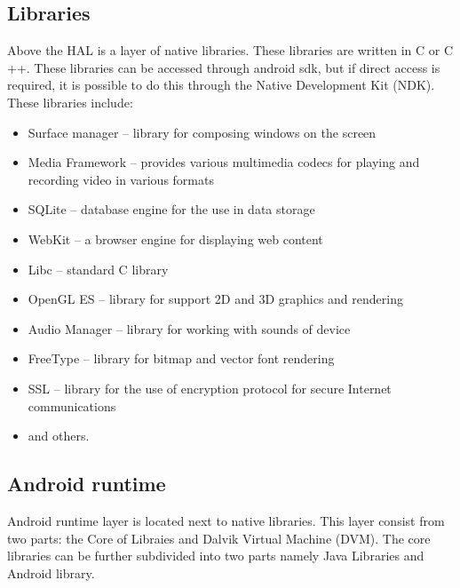 \subsection{Libraries}
Above the HAL is a layer of native libraries. These libraries are written in C or C ++. These libraries can be accessed through android sdk, but if direct access is required, it is possible to do this through the Native Development Kit (NDK). These libraries include:

\begin{itemize} %
\item Surface manager -- library for composing windows on the screen
\item Media Framework -- provides various multimedia codecs for playing and recording video in various formats
\item SQLite -- database engine for the use in data storage
\item WebKit -- a browser engine for displaying web content
\item Libc -- standard C library
\item OpenGL ES -- library for support 2D and 3D graphics and rendering
\item Audio Manager -- library for working with sounds of device
\item FreeType -- library for bitmap and vector font rendering
\item SSL -- library for the use of encryption protocol for secure Internet communications
\item and others.
\end{itemize}

\subsection{Android runtime}
Android runtime layer is located next to native libraries. This layer consist from two parts: the Core of Libraies and Dalvik Virtual Machine (DVM). The core libraries can be further subdivided into two parts namely Java Libraries and Android library.


